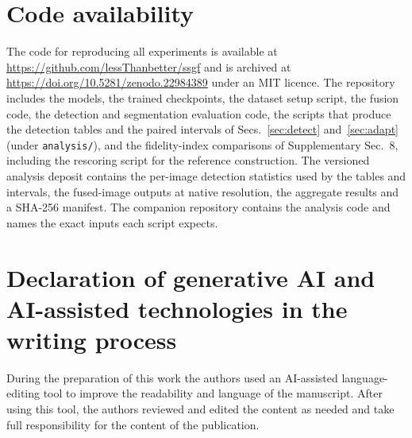 \documentclass[preprint,10pt]{elsarticle}
\begin{document}
\section*{Code availability}
The code for reproducing all experiments is available at
\url{https://github.com/lessThanbetter/ssgf} and is archived at
\url{https://doi.org/10.5281/zenodo.22984389} under an MIT licence. The repository
includes the models,
the trained checkpoints, the dataset setup script, the fusion code, the detection
and segmentation evaluation code, the scripts that produce the detection tables and
the paired intervals of Secs.~\ref{sec:detect} and~\ref{sec:adapt} (under
\texttt{analysis/}), and the fidelity-index comparisons of Supplementary Sec.~8, including
the rescoring script for the reference construction. The versioned analysis deposit
contains the per-image detection statistics used by the tables and intervals, the
fused-image outputs at native resolution, the aggregate results and a SHA-256 manifest.
The companion repository contains the analysis code and names the exact inputs each
script expects.

\section*{Declaration of generative AI and AI-assisted technologies in the writing process}
During the preparation of this work the authors used an AI-assisted language-editing
tool to improve the readability and language of the manuscript. After using this tool,
the authors reviewed and edited the content as needed and take full responsibility for
the content of the publication.

\begingroup
\singlespacing
\footnotesize

\endgroup
\end{document}
